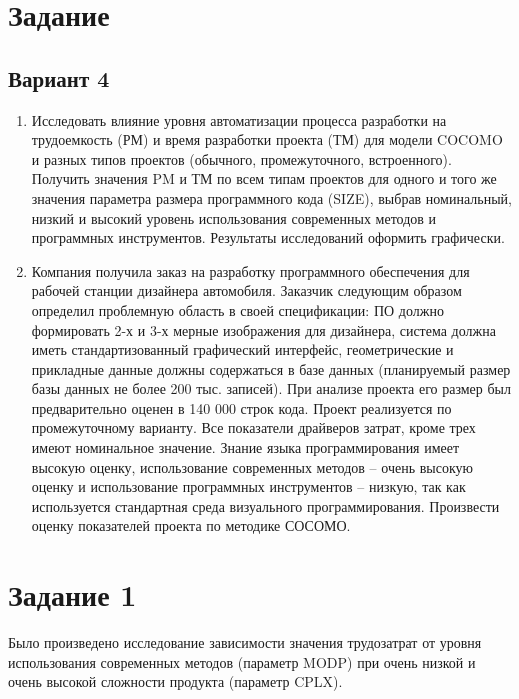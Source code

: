 \section{Задание}

\subsection{Вариант 4}

\begin{enumerate}
    \item Исследовать влияние уровня автоматизации процесса разработки на трудоемкость (РМ) и время разработки проекта (ТМ) для модели COCOMO и разных типов проектов (обычного, промежуточного, встроенного). Получить значения PM и ТМ по всем типам проектов для одного и того же значения параметра размера программного кода (SIZE), выбрав номинальный, низкий и высокий уровень использования современных методов и программных инструментов. Результаты исследований оформить графически.

    \item Компания получила заказ на разработку программного обеспечения для рабочей станции дизайнера автомобиля. Заказчик следующим образом определил проблемную область в своей спецификации: ПО должно формировать 2-х и 3-х мерные изображения для дизайнера, система должна иметь стандартизованный графический интерфейс, геометрические и прикладные данные должны содержаться в базе данных (планируемый размер базы данных не более 200 тыс. записей). При анализе проекта его размер был предварительно оценен в 140 000 строк кода. Проект реализуется по промежуточному варианту. Все показатели драйверов затрат, кроме трех имеют номинальное значение. Знание языка программирования имеет высокую оценку, использование современных методов – очень высокую оценку и использование программных инструментов – низкую, так как используется стандартная среда визуального программирования. Произвести оценку показателей проекта по методике СОСОМО.
\end{enumerate}

\section{Задание 1}

Было произведено исследование зависимости значения трудозатрат от уровня использования современных методов (параметр MODP) при очень низкой и очень высокой сложности продукта (параметр CPLX).

